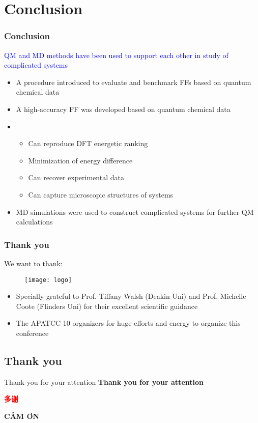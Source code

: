 \documentclass[xcolor=table,aspectratio=169]{beamer}
\begin{document}
\section{Conclusion}

\begin{frame}
	\frametitle{Conclusion}
	\textcolor{blue}{QM and MD methods have been used to support each other in study of complicated systems}
	\begin{itemize}
		\item A procedure introduced to evaluate and benchmark FFs based on quantum chemical data 
		\item A high-accuracy FF was developed based on quantum chemical data
		\item \begin{itemize}
			\item Can reproduce DFT energetic ranking
			\item Minimization of energy difference
			\item Can recover experimental data 
			\item Can capture microscopic structures of systems
		\end{itemize}
		\item MD simulations were used to construct complicated systems for further QM calculations
	\end{itemize}
\end{frame}


\begin{frame}
	\frametitle{Thank you}
	We want to thank:
	\begin{figure}
		\texttt{[image: logo]}
	\end{figure}
	\begin{itemize}
		\item Specially grateful to Prof. Tiffany Walsh (Deakin Uni) and Prof. Michelle Coote (Flinders Uni) for their excellent scientific guidance
		\item The APATCC-10 organizers for huge efforts and energy to organize this conference
	\end{itemize}
\end{frame}







\subsection*{Thank you}

\begin{frame}{Thank you for your attention}
	\centering
	\textcolor{flinders-blue}{\textbf{\LARGE Thank you for your attention}}\\

	\vspace{0.5cm}

	\begin{CJK*}{UTF8}{zhsong}
		\textcolor{red}{\textbf{\LARGE 多谢}} \clearpage\end{CJK*}

	\textcolor{kul-blue}{\textbf{\LARGE CẢM ƠN}}\\

\end{frame}
\end{document}
